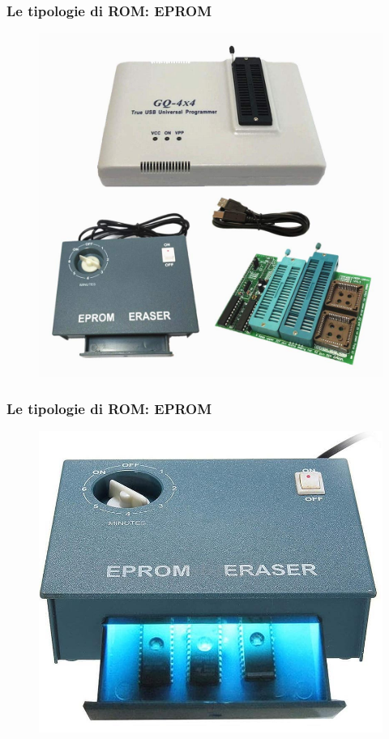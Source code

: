 \begin{frame}
	\frametitle{Le tipologie di ROM: EPROM}
	 
	\begin{figure}[!htbp] 
		\centering
		\includegraphics[width=0.6\linewidth]{images/5_memory/eprom_writer_eraser.jpg}
	\end{figure}
	
\end{frame}


\begin{frame}
	\frametitle{Le tipologie di ROM: EPROM}
	 
	\begin{figure}[!htbp] 
		\centering
		\includegraphics[width=0.6\linewidth]{images/5_memory/eprom_eraser.jpg}
	\end{figure}
	
\end{frame}



